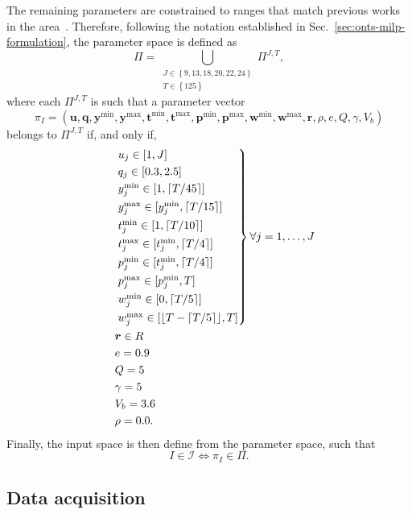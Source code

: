 The remaining parameters are constrained to ranges that match previous works in the area~\cite{rigoBranchandpriceAlgorithmNanosatellite2022,semanEnergyAwareTaskScheduling2022,rigoTaskSchedulingOptimal2021}.
Therefore, following the notation established in Sec.~\ref{sec:onts-milp-formulation}, the parameter space is defined as \[
\Pi = \bigcup_{\substack{J \in \left\{ 9,13,18,20,22,24 \right\} \\ T \in \left\{ 125 \right\} }} \Pi^{J,T}
,\] where each $\Pi^{J,T}$ is such that a parameter vector \[
\pi_I= \left( \bm{u}, \bm{q}, \bm{y}^{\min}, \bm{y}^{\max}, \bm{t}^{\min}, \bm{t}^{\max}, \bm{p}^{\min}, \bm{p}^{\max}, \bm{w}^{\min}, \bm{w}^{\max}, \bm{r}, \rho, e, Q, \gamma, V_b \right)
\] belongs to $\Pi^{J,T}$ if, and only if,
\begin{equation*}
\begin{aligned}
&\begin{rcases}
    & u_j \in [1, J] \\
	 & q_j \in [0.3, 2.5] \\
    	 & y_j^{\min} \in [1, \lceil T/45 \rceil] \\
    	 & y_j^{\max} \in [y_j^{\min}, \lceil T/15 \rceil] \\
    	 & t_j^{\min} \in [1, \lceil T/10 \rceil] \\
    	 & t_j^{\max} \in [t_j^{\min}, \lceil T/4 \rceil] \\
    	 & p_j^{\min} \in [t_j^{\min}, \lceil T/4 \rceil] \\
    	 & p_j^{\max} \in [p_j^{\min}, T] \\
    	 & w_j^{\min} \in [0, \lceil T/5 \rceil] \\
    	 & w_j^{\max} \in [\lfloor T-\lceil T/5 \rceil \rfloor, T]
\end{rcases} \forall j =1,\ldots,J \\
    &\quad \bm{r} \in R \\
    &\quad e = 0.9 \\
    &\quad Q = 5 \\
    &\quad \gamma = 5 \\
    &\quad V_b = 3.6 \\
    &\quad \rho = 0.0
.\end{aligned}
\end{equation*}
Finally, the input space is then define from the parameter space, such that \[
    I\in \mathcal{I} \iff \pi_I \in \Pi 
.\] 


\subsection{Data acquisition}\label{sec:data-acquisition}

